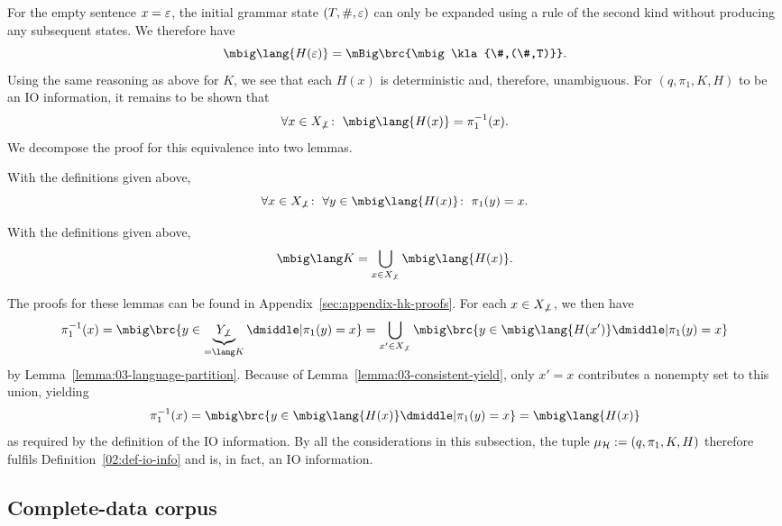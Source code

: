 For the empty sentence $x=\varepsilon$, the initial grammar state $(T,\#,\varepsilon)$ can
only be expanded using a rule of the second kind without producing any subsequent states.
We therefore have
\[
 \mbig\lang{H(\eps)} = \mBig\brc{\mbig\kla{\#,(\#,T)}}.
\]
%
Using the same reasoning as above for $K$, we see that each $H(x)$ is
deterministic and, therefore, unambiguous. For $(q,\pi_1,K,H)$ to be an IO
information, it remains to be shown that
\[
 \forall x\in X_{\not\bot}\colon\;
 \mbig\lang{H(x)} = \pi_1^{-1}(x).
\]
We decompose the proof for this equivalence into two lemmas.

\begin{lemma}\label{lemma:03-consistent-yield}
 With the definitions given above,
 \[
  \forall x\in X_{\not\bot}\colon\;
  \forall y\in \mbig\lang{H(x)}\colon\;
  \pi_1(y) = x.
 \]
\end{lemma}

\begin{lemma}\label{lemma:03-language-partition}
 With the definitions given above,
 \[
  \mbig\lang K = \bigcup_{x\in X_{\not\bot}} \mbig\lang{H(x)}.
 \]
\end{lemma}

The proofs for these lemmas can be found in Appendix~\ref{sec:appendix-hk-proofs}. For each $x\in X_{\not\bot}$, we then have
\[
 \pi_1^{-1}(x)
 = \mbig\brc{y\in \underbrace{Y_{\not\bot}}_{=\lang K} \pipe \pi_1(y) = x}
 = \bigcup_{x'\in X_{\not\bot}} \mbig\brc{y\in\mbig\lang{H(x')} \pipe \pi_1(y) = x}
\]
by Lemma~\ref{lemma:03-language-partition}. Because of
Lemma~\ref{lemma:03-consistent-yield}, only $x'=x$ contributes
a nonempty set to this union, yielding
\[
 \pi_1^{-1}(x) = \mbig\brc{y\in\mbig\lang{H(x)} \pipe \pi_1(y) = x} = \mbig\lang{H(x)}
\]
as required by the definition of the IO information. By all the considerations
in this subsection, the tuple $\mu_\mathcal H := (q,\pi_1,K,H)$ therefore fulfils
Definition~\ref{02:def-io-info} and is, in fact, an IO information.

\subsection{Complete-data corpus}\label{sect:03-complete-data-intro}

